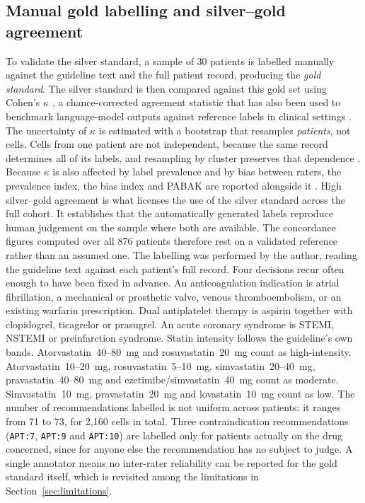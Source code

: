 \subsection{Manual gold labelling and silver--gold agreement}
\label{sec:goldlabel}
To validate the silver standard, a sample of 30 patients is labelled manually
against the guideline text and the full patient record, producing the \emph{gold standard}.
The silver standard is then compared against this gold set using Cohen's $\kappa$
\cite{cohen1960}, a chance-corrected agreement statistic that has also been used to
benchmark language-model outputs against reference labels in clinical settings
\cite{shah2024}. The uncertainty of $\kappa$ is estimated with a bootstrap \cite{efron1994}
that resamples \emph{patients}, not cells. Cells from one patient are not independent, because
the same record determines all of its labels, and resampling by cluster preserves that
dependence \cite{field2007}. Because $\kappa$ is also affected by label prevalence and by bias
between raters, the prevalence index, the bias index and PABAK are reported alongside it
\cite{byrt1993}. High silver--gold agreement is what licenses the use of the silver
standard across the full cohort. It establishes that the automatically generated labels
reproduce human judgement on the sample where both are available. The concordance
figures computed over all 876 patients therefore rest on a validated reference rather
than an assumed one.
The labelling was performed by the author, reading the guideline text against each
patient's full record. Four decisions recur often enough to have been fixed in advance.
An anticoagulation indication is atrial fibrillation, a mechanical or prosthetic valve,
venous thromboembolism, or an existing warfarin prescription. Dual antiplatelet therapy
is aspirin together with clopidogrel, ticagrelor or prasugrel. An acute coronary syndrome
is STEMI, NSTEMI or preinfarction syndrome. Statin intensity follows the guideline's own bands. Atorvastatin~40--80~mg and
rosuvastatin~20~mg count as high-intensity. Atorvastatin~10--20~mg, rosuvastatin~5--10~mg,
simvastatin~20--40~mg, pravastatin~40--80~mg and ezetimibe/simvastatin~40~mg count as
moderate. Simvastatin~10~mg, pravastatin~20~mg and lovastatin~10~mg count as low. The number of recommendations labelled is not uniform across patients: it
ranges from 71 to 73, for 2{,}160 cells in total. Three contraindication recommendations
(\texttt{APT:7}, \texttt{APT:9} and \texttt{APT:10}) are labelled only for patients
actually on the drug concerned, since for anyone else the recommendation has no subject to
judge. A single annotator
means no inter-rater reliability can be reported for the gold standard itself, which is
revisited among the limitations in Section~\ref{sec:limitations}.

